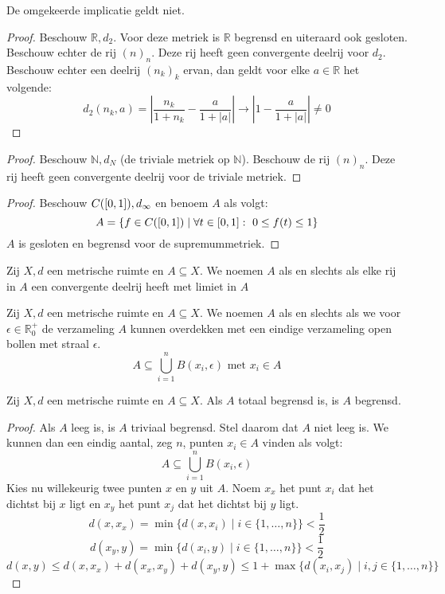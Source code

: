 \documentclass[main.tex]{subfiles}
\begin{document}
\begin{tvb}
  De omgekeerde implicatie geldt niet.

  \begin{proof}
    Beschouw $\mathbb{R},d_{2}$.
    Voor deze metriek is $\mathbb{R}$ begrensd en uiteraard ook gesloten.
    Beschouw echter de rij $(n)_{n}$.
    Deze rij heeft geen convergente deelrij voor $d_{2}$.
    Beschouw echter een deelrij $(n_{k})_{k}$ ervan, dan geldt voor elke $a\in \mathbb{R}$ het volgende:
    \[ d_{2}(n_{k},a) = \left| \frac{n_{k}}{1+n_{k}} - \frac{a}{1+|a|} \right| \rightarrow \left|1-\frac{a}{1+|a|}\right| \neq 0 \]
  \end{proof}
  \begin{proof}
    Beschouw $\mathbb{N},d_{N}$ (de triviale metriek op $\mathbb{N}$).
    Beschouw de rij $(n)_{n}$.
    Deze rij heeft geen convergente deelrij voor de triviale metriek.
  \end{proof}
  \begin{proof}
    Beschouw $C(\interval{0}{1}),d_{\infty}$ en benoem $A$ als volgt:
    \[ A = \{ f\in C(\interval{0}{1}) \mid \forall t\in \interval{0}{1}:\ 0 \le f(t) \le 1 \} \]
    $A$ is gesloten en begrensd voor de supremummetriek.
  \end{proof}
\end{tvb}

\begin{de}
  Zij $X,d$ een metrische ruimte en $A \subseteq X$.
  We noemen $A$  als en slechts als elke rij in $A$ een convergente deelrij heeft met limiet in $A$
\end{de}

\begin{de}
  Zij $X,d$ een metrische ruimte en $A \subseteq X$.
  We noemen $A$  als en slechts als we voor $\epsilon \in \mathbb{R}_{0}^{+}$ de verzameling $A$ kunnen overdekken met een eindige verzameling open bollen met straal $\epsilon$.
  \[ A \subseteq \bigcup_{i=1}^{n}B(x_{i},\epsilon) \text{ met } x_{i} \in A \]
\end{de}

\begin{bpr}
  Zij $X,d$ een metrische ruimte en $A \subseteq X$.
  Als $A$ totaal begrensd is, is $A$ begrensd.

  \begin{proof}
    Als $A$ leeg is, is $A$ triviaal begrensd.
    Stel daarom dat $A$ niet leeg is.
    We kunnen dan een eindig aantal, zeg $n$, punten $x_{i}\in A$ vinden als volgt:
    \[ A \subseteq \bigcup_{i=1}^{n}B(x_{i},\epsilon) \]
    Kies nu willekeurig twee punten $x$ en $y$ uit $A$.
    Noem $x_{x}$ het punt $x_{i}$ dat het dichtst bij $x$ ligt en $x_{y}$ het punt $x_{j}$ dat het dichtst bij $y$ ligt.
    \[ d(x,x_{x}) = \min\{ d(x,x_{i}) \mid i \in \{ 1,\dotsc,n \}\} < \frac{1}{2} \]
    \[ d(x_{y},y) = \min\{ d(x_{i},y) \mid i \in \{ 1,\dotsc,n \}\} < \frac{1}{2} \]
    \[ d(x,y) \le d(x,x_{x}) + d(x_{x},x_{y}) + d(x_{y},y) \le 1 + \max\{ d(x_{i},x_{j}) \mid i,j \in \{1,\dotsc,n\} \} \]
  \end{proof}
\end{bpr}
\end{document}

